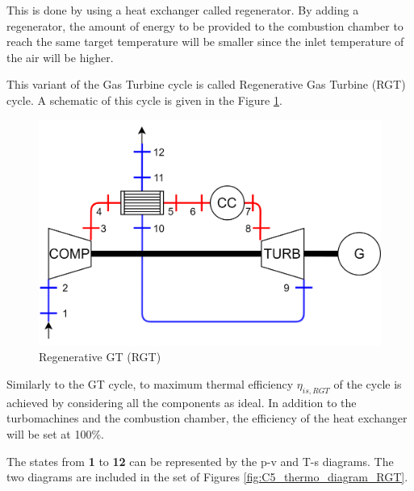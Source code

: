 This is done by using a heat exchanger called regenerator. By adding a regenerator, the amount of energy to be provided to the combustion chamber to reach the same target temperature will be smaller since the inlet temperature of the air will be higher.

This variant of the Gas Turbine cycle is called Regenerative Gas Turbine (RGT) cycle. A schematic of this cycle is given in the Figure \ref{fig:C5_RGT}.

\begin{figure}[h]
\centering
\includegraphics[scale=0.15]{RGT}
\caption{Regenerative GT (RGT)}
\label{fig:C5_RGT}
\end{figure}

Similarly to the GT cycle, to maximum thermal efficiency $\eta_{is,RGT}$ of the cycle is achieved by considering all the components as ideal. In addition to the turbomachines and the combustion chamber, the efficiency of the heat exchanger will be set at 100\%. 

The states from \textbf{1} to \textbf{12} can be represented by the p-v and T-s  diagrams. The two diagrams are included in the set of Figures \ref{fig:C5_thermo_diagram_RGT}.

